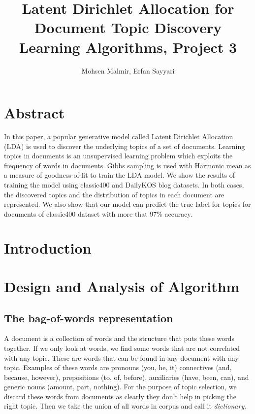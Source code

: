 \documentclass[twoside,12pt]{article}
\begin{document}
\title{Latent Dirichlet Allocation for Document Topic Discovery\\  Learning Algorithms, Project 3}
\author{Mohsen Malmir, Erfan Sayyari}
\maketitle
\section{Abstract}
In this paper, a popular generative model called Latent Dirichlet Allocation (LDA) is used to discover the underlying topics of  a set of documents. Learning topics in documents is an unsupervised learning problem which exploits the frequency of words in documents. Gibbs sampling is used with Harmonic mean as a measure of goodness-of-fit to train the LDA model. We show the results of training the model using classic400 and DailyKOS blog datasets. In both cases, the discovered topics and the distribution of topics in each document are represented. We also show that our model can predict the true label for topics for documents of classic400 dataset with more that 97\% accuracy.

\section{Introduction}



\section{Design and Analysis of Algorithm}

\subsection{The bag-of-words representation}
A document is a collection of words and the structure that puts these words together. If we only look at words, we find some words that are not correlated with any topic. These are words that can be found in any document with any topic. Examples of these words are pronouns (you, he, it) connectives (and, because, however), prepositions (to, of, before), auxiliaries (have, been, can), and generic nouns (amount, part, nothing). For the purpose of topic selection, we discard these words from documents as clearly they don't help in picking the right topic. Then we take the union of all words in corpus and call it \emph{dictionary}.
\end{document}
